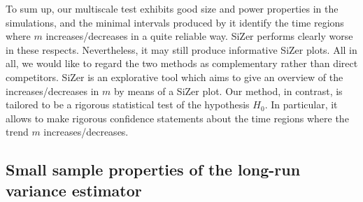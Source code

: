 

To sum up, our multiscale test exhibits good size and power properties in the simulations, and the minimal intervals produced by it identify the time regions where $m$ increases/decreases in a quite reliable way. SiZer performs clearly worse in these respects. Nevertheless, it may still produce informative SiZer plots. %
All in all, we would like to regard the two methods as complementary rather than direct competitors. SiZer is an explorative tool which aims to give an overview of the increases/decreases in $m$ by means of a SiZer plot. Our method, in contrast, is tailored to be a rigorous statistical test of the hypothesis $H_0$. In particular, it allows to make rigorous confidence statements about the time regions where the trend $m$ increases/decreases. %


\subsection{Small sample properties of the long-run variance estimator}\label{subsec-sim-lrv}


